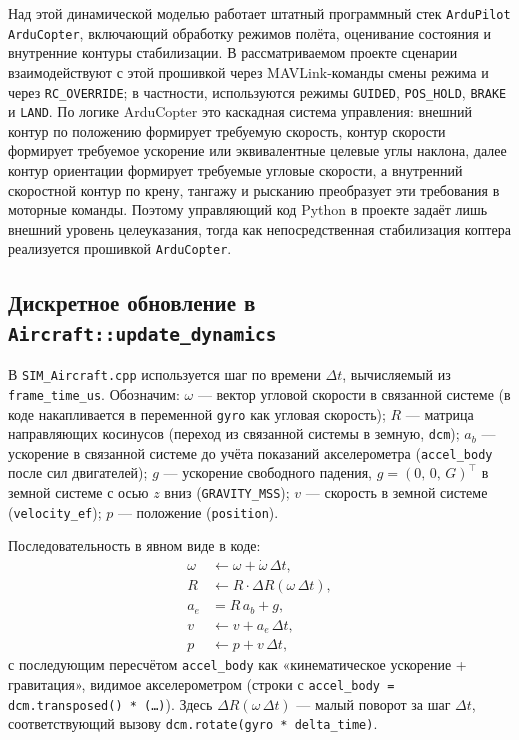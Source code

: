 \documentclass[12pt,a4paper]{article}
\begin{document}
Над этой динамической моделью работает штатный программный стек \texttt{ArduPilot ArduCopter}, включающий обработку режимов полёта, оценивание состояния и внутренние контуры стабилизации. В рассматриваемом проекте сценарии взаимодействуют с этой прошивкой через MAVLink-команды смены режима и через \texttt{RC\_OVERRIDE}; в частности, используются режимы \texttt{GUIDED}, \texttt{POS\_HOLD}, \texttt{BRAKE} и \texttt{LAND}. По логике ArduCopter это каскадная система управления: внешний контур по положению формирует требуемую скорость, контур скорости формирует требуемое ускорение или эквивалентные целевые углы наклона, далее контур ориентации формирует требуемые угловые скорости, а внутренний скоростной контур по крену, тангажу и рысканию преобразует эти требования в моторные команды. Поэтому управляющий код Python в проекте задаёт лишь внешний уровень целеуказания, тогда как непосредственная стабилизация коптера реализуется прошивкой \texttt{ArduCopter}.

\subsection{Дискретное обновление в \texttt{Aircraft::update\_dynamics}}

В \texttt{SIM\_Aircraft.cpp} используется шаг по времени $\Delta t$, вычисляемый из \texttt{frame\_time\_us}. Обозначим: $\omega$ --- вектор угловой скорости в связанной системе (в коде накапливается в переменной \texttt{gyro} как угловая скорость); $R$ --- матрица направляющих косинусов (переход из связанной системы в земную, \texttt{dcm}); $a_b$ --- ускорение в связанной системе до учёта показаний акселерометра (\texttt{accel\_body} после сил двигателей); $g$ --- ускорение свободного падения, $g = (0,\,0,\,G)^\top$ в земной системе с осью $z$ вниз (\texttt{GRAVITY\_MSS}); $v$ --- скорость в земной системе (\texttt{velocity\_ef}); $p$ --- положение (\texttt{position}).

Последовательность в явном виде в коде:
\begin{align}
  \omega &\leftarrow \omega + \dot{\omega}\,\Delta t, \\
  R &\leftarrow R \cdot \Delta R(\omega\,\Delta t), \\
  a_e &= R\, a_b + g, \\
  v &\leftarrow v + a_e\,\Delta t, \\
  p &\leftarrow p + v\,\Delta t,
\end{align}
с последующим пересчётом \texttt{accel\_body} как «кинематическое ускорение + гравитация», видимое акселерометром (строки с \texttt{accel\_body = dcm.transposed() * (\ldots)}). Здесь $\Delta R(\omega\,\Delta t)$ --- малый поворот за шаг $\Delta t$, соответствующий вызову \texttt{dcm.rotate(gyro * delta\_time)}.
\end{document}
